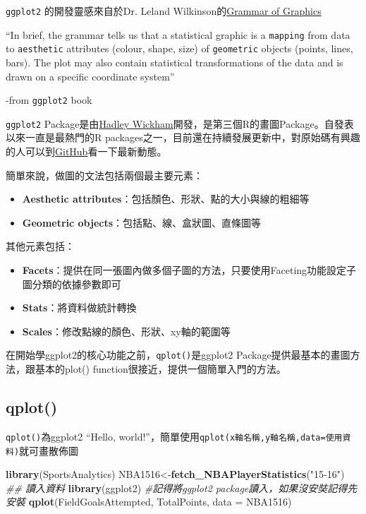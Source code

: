 \documentclass[
]{book}
\newenvironment{Shaded}{\begin{snugshade}}{\end{snugshade}}
\newcommand{\CommentTok}[1]{\textcolor[rgb]{0.56,0.35,0.01}{\textit{#1}}}
\newcommand{\DataTypeTok}[1]{\textcolor[rgb]{0.13,0.29,0.53}{#1}}
\newcommand{\KeywordTok}[1]{\textcolor[rgb]{0.13,0.29,0.53}{\textbf{#1}}}
\newcommand{\NormalTok}[1]{#1}
\newcommand{\StringTok}[1]{\textcolor[rgb]{0.31,0.60,0.02}{#1}}
\providecommand{\tightlist}{%
  \setlength{\itemsep}{0pt}\setlength{\parskip}{0pt}}
\begin{document}
\texttt{ggplot2} \citep{R-ggplot2}的開發靈感來自於Dr. Leland Wilkinson的\href{http://www.springer.com/us/book/9780387245447}{Grammar of Graphics}

``In brief, the grammar tells us that a statistical graphic is a \texttt{mapping} from data to \texttt{aesthetic} attributes (colour, shape, size) of \texttt{geometric} objects (points, lines, bars). The plot may also contain statistical transformations of the data and is drawn on a specific coordinate system''

-from \texttt{ggplot2} book

\texttt{ggplot2} Package是由\href{http://hadley.nz/}{Hadley Wickham}開發，是第三個R的畫圖Package。自發表以來一直是最熱門的R packages之一，目前還在持續發展更新中，對原始碼有興趣的人可以到\href{https://github.com/tidyverse/ggplot2}{GitHub}看一下最新動態。

簡單來說，做圖的文法包括兩個最主要元素：

\begin{itemize}
\tightlist
\item
  \textbf{Aesthetic attributes}：包括顏色、形狀、點的大小與線的粗細等
\item
  \textbf{Geometric objects}：包括點、線、盒狀圖、直條圖等
\end{itemize}

其他元素包括：

\begin{itemize}
\tightlist
\item
  \textbf{Facets}：提供在同一張圖內做多個子圖的方法，只要使用Faceting功能設定子圖分類的依據參數即可
\item
  \textbf{Stats}：將資料做統計轉換
\item
  \textbf{Scales}：修改點線的顏色、形狀、xy軸的範圍等
\end{itemize}

在開始學ggplot2的核心功能之前，\texttt{qplot()}是ggplot2 Package提供最基本的畫圖方法，跟基本的plot() function很接近，提供一個簡單入門的方法。

\hypertarget{qplot}{%
\subsection{qplot()}\label{qplot}}

\texttt{qplot()}為ggplot2 ``Hello, world!''，簡單使用\texttt{qplot(x軸名稱,y軸名稱,data=使用資料)}就可畫散佈圖

\begin{Shaded}
\begin{Highlighting}[]
\KeywordTok{library}\NormalTok{(SportsAnalytics)}
\NormalTok{NBA1516<-}\KeywordTok{fetch_NBAPlayerStatistics}\NormalTok{(}\StringTok{"15-16"}\NormalTok{) }\CommentTok{## 讀入資料}
\KeywordTok{library}\NormalTok{(ggplot2) }\CommentTok{#記得將ggplot2 package讀入，如果沒安奘記得先安裝}
\KeywordTok{qplot}\NormalTok{(FieldGoalsAttempted, TotalPoints, }\DataTypeTok{data =}\NormalTok{ NBA1516)}
\end{Highlighting}
\end{Shaded}
\end{document}

